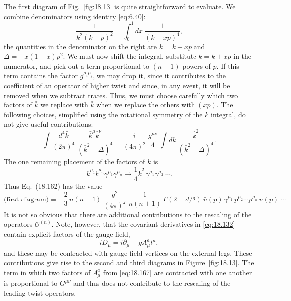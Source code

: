 The first diagram of Fig.~\ref{fig:18.13} is quite straightforward to
evaluate.  We combine denominators using identity \eqref{eq:6.40}:
\begin{equation}
  \frac{1}{k^2(k-p)^2} = \int_0^1 dx\ \frac{1}{(k-xp)^4} ,
  \label{eq:18.163}
\end{equation}
the quantities in the denominator on the right are
$\bar{k} = k - xp$ and $\Delta = -x(1-x)p^2$.  We must now shift the
integral, substitute $\bar{k} = k + xp$ in the numerator, and pick out a term
proportional to $(n-1)$ powers of $p$.  If this term contains the factor
$g^{\mu_i\mu_j}$, we may drop it, since it contributes to the coefficient of
an operator of higher twist and since, in any event, it will be removed when
we subtract traces.  Thus, we must choose carefully which two factors of
$\bar{k}$ we replace with $\bar{k}$ when we replace the others with $(xp)$.
The following choices, simplified using the rotational symmetry of the
$\bar{k}$ integral, do not give useful contributions:
\begin{equation}
  \int \frac{d^4\bar{k}}{(2\pi)^4}\ \frac{\bar{k}^\mu\bar{k}^\nu}
    {(\bar{k}^2-\Delta)^4} = \frac{i}{(4\pi)^2}\ \frac{g^{\mu\nu}}{4}\
      \int d\bar{k}\ \frac{\bar{k}^2}{(\bar{k}^2-\Delta)^4} .
  \label{eq:18.164}
\end{equation}
The one remaining placement of the factors of $\bar{k}$ is
\begin{equation}
  \bar{k}^{\mu_1}\bar{k}^{\mu_n}\gamma^{\mu_1}\gamma^{\mu_n}
  \to \frac{1}{4}\bar{k}^2\,\gamma^{\mu_1}\gamma^{\mu_2}\ \cdots .
  \label{eq:18.165}
\end{equation}
Thus Eq.~(18.162) has the value
\begin{equation}
  \text{(first diagram)} = -\frac{2}{3}\,n(n+1)\ \frac{g^2}{(4\pi)^2}\
    \frac{1}{n(n+1)}\,\Gamma(2-d/2)\ \bar{u}(p)\,\gamma^{\mu_1}\,p^{\mu_2}
    \cdots p^{\mu_n}\,u(p)\ \cdots .
  \label{eq:18.166}
\end{equation}
It is not so obvious that there are additional contributions to the rescaling
of the operators $\mathcal{O}^{(n)}$.  Note, however, that the covariant
derivatives in \eqref{eq:18.132} contain explicit factors of the gauge field,
\begin{equation}
  iD_\mu = i\partial_\mu - gA^a_\mu t^a ,
  \label{eq:18.167}
\end{equation}
and these may be contracted with gauge field vertices on the external legs.
These contributions give rise to the second and third diagrams in
Figure~\ref{fig:18.13}.  The term in which two factors of $A^a_\mu$ from
\eqref{eq:18.167} are contracted with one another is proportional to
$G^{\mu\nu}$ and thus does not contribute to the rescaling of the
leading-twist operators.

